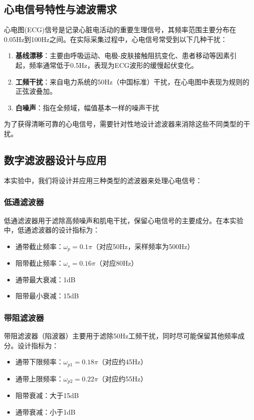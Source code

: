 \documentclass[12pt,hyperref,a4paper,UTF8]{ctexart}
\begin{document}
\subsection{心电信号特性与滤波需求}

心电图(ECG)信号是记录心脏电活动的重要生理信号，其频率范围主要分布在0.05Hz到100Hz之间。在实际采集过程中，心电信号常受到以下几种干扰：

\begin{enumerate}
    \item \textbf{基线漂移}：主要由呼吸运动、电极-皮肤接触阻抗变化、患者移动等因素引起，频率通常低于0.5Hz，表现为ECG波形的缓慢起伏变化。
    
    \item \textbf{工频干扰}：来自电力系统的50Hz（中国标准）干扰，在心电图中表现为规则的正弦波叠加。
    
    \item \textbf{白噪声}：指在全频域，幅值基本一样的噪声干扰
\end{enumerate}

为了获得清晰可靠的心电信号，需要针对性地设计滤波器来消除这些不同类型的干扰。

\subsection{数字滤波器设计与应用}

本实验中，我们将设计并应用三种类型的滤波器来处理心电信号：

\subsubsection{低通滤波器}

低通滤波器用于滤除高频噪声和肌电干扰，保留心电信号的主要成分。在本实验中，低通滤波器的设计指标为：
\begin{itemize}
    \item 通带截止频率：\(\omega_p = 0.1\pi\)（对应50Hz，采样频率为500Hz）
    \item 阻带截止频率：\(\omega_s = 0.16\pi\)（对应80Hz）
    \item 通带最大衰减：1dB
    \item 阻带最小衰减：15dB
\end{itemize}

\subsubsection{带阻滤波器}

带阻滤波器（陷波器）主要用于滤除50Hz工频干扰，同时尽可能保留其他频率成分。设计指标为：
\begin{itemize}
    \item 通带下限频率：\(\omega_{p1} = 0.18\pi\)（对应约45Hz）
    \item 通带上限频率：\(\omega_{p2} = 0.22\pi\)（对应约55Hz）
    \item 阻带衰减：大于15dB
    \item 通带衰减：小于1dB
\end{itemize}
\end{document}
